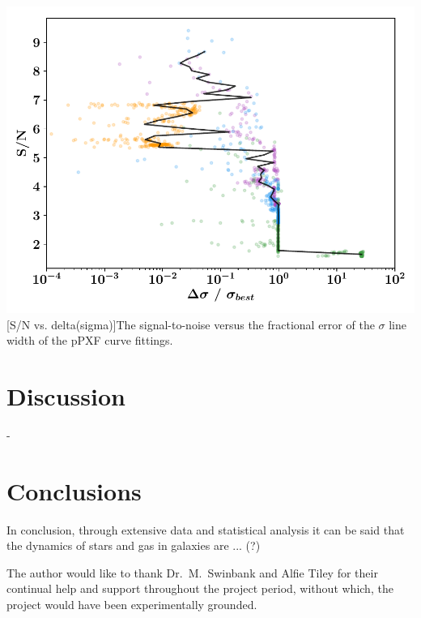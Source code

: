 \documentclass[12pt, twocolumn]{revtex4}    %
\begin{document}
\begin{center}
\includegraphics[width=1.0\linewidth]{data/reprocessed_sn_vs_sigma}
[S/N vs. delta(sigma)]{The signal-to-noise versus the fractional error of the $\sigma$ line width of the pPXF curve fittings.}
\label{fig:oiiluminosity_redshift}
\end{center}

\section{Discussion} 

-

\section{Conclusions}
 
In conclusion, through extensive data and statistical analysis it can be said that the dynamics of stars and gas in galaxies are ... (?) 

\begin{acknowledgments}
The author would like to thank Dr.~M.~Swinbank and Alfie Tiley for their continual help and support throughout the project period, without which, the project would have been experimentally grounded.
\end{acknowledgments}



\end{document}

